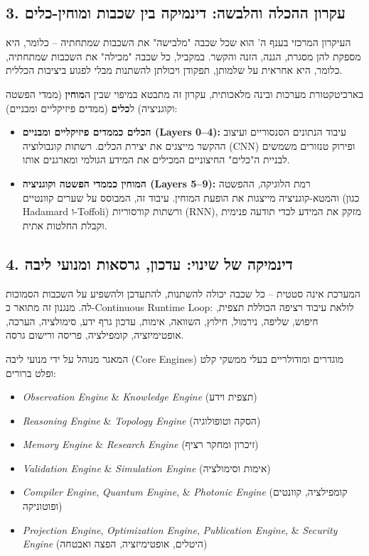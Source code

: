 \documentclass{article}
\begin{document}
\subsection{3. עקרון ההכלה והלבשה: דינמיקה בין שכבות ומוחין-כלים}
העיקרון המרכזי בענף ה' הוא שכל שכבה "מלבישה" את השכבות שמתחתיה – כלומר, היא מספקת להן מסגרת, הגנה, הזנה והקשר. במקביל, כל שכבה "מכילה" את השכבות שמתחתיה, כלומר, היא אחראית על שלמותן, תפקודן ויכולתן להשתנות מבלי לפגוע ביציבות הכללית.

בארכיטקטורת מערכות ובינה מלאכותית, עקרון זה מתבטא במיפוי שבין ה\textbf{מוחין} (ממדי הפשטה וקוגניציה) ל\textbf{כלים} (ממדים פיזיקליים ומבניים):
\begin{itemize}
    \item \textbf{הכלים כממדים פיזיקליים ומבניים (Layers 0--4):} עיבוד הנתונים הסנסוריים ועיצוב ההקשר מייצגים את יצירת הכלים. רשתות קונבולוציה (CNN) ופירוק טנזורים משמשים לבניית ה"כלים" החיצוניים המכילים את המידע הגולמי ומארגנים אותו.
    \item \textbf{המוחין כממדי הפשטה וקוגניציה (Layers 5--9):} רמת הלוגיקה, ההפשטה והמטא-קוגניציה מייצגות את הופעת המוחין. עיבוד זה, המבוסס על שערים קוונטיים (כגון Hadamard ו-Toffoli) ורשתות קורסוריות (RNN), מזקק את המידע לכדי תודעה פנימית וקבלת החלטות אתית.
\end{itemize}

\subsection{4. דינמיקה של שינוי: עדכון, גרסאות ומנועי ליבה}
המערכת אינה סטטית – כל שכבה יכולה להשתנות, להתעדכן ולהשפיע על השכבות הסמוכות לה. מנגנון זה מתואר כ-Continuous Runtime Loop: לולאת עיבוד רציפה הכוללת תצפית, חיפוש, שליפה, נירמול, חילוץ, השוואה, אימות, עדכון גרף ידע, סימולציה, הערכה, אופטימיזציה, קומפילציה, פריסה ורישום גרסה.

המאגר מנוהל על ידי מנועי ליבה (Core Engines) מוגדרים ומודולריים בעלי ממשקי קלט ופלט ברורים:
\begin{itemize}
    \item \textit{Observation Engine} \& \textit{Knowledge Engine} (תצפית וידע)
    \item \textit{Reasoning Engine} \& \textit{Topology Engine} (הסקה וטופולוגיה)
    \item \textit{Memory Engine} \& \textit{Research Engine} (זיכרון ומחקר רציף)
    \item \textit{Validation Engine} \& \textit{Simulation Engine} (אימות וסימולציה)
    \item \textit{Compiler Engine}, \textit{Quantum Engine}, \& \textit{Photonic Engine} (קומפילציה, קוונטים ופוטוניקה)
    \item \textit{Projection Engine}, \textit{Optimization Engine}, \textit{Publication Engine}, \& \textit{Security Engine} (היטלים, אופטימיזציה, הפצה ואבטחה)
\end{itemize}
\end{document}
